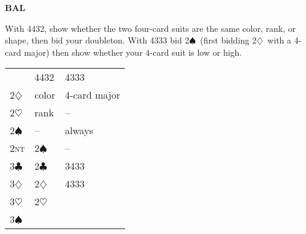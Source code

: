 \documentclass{article}
\renewcommand{\c}{$\clubsuit$}
\renewcommand{\d}{$\diamondsuit$}
\newcommand{\h}{$\heartsuit$}
\newcommand{\s}{$\spadesuit$}
\newcommand{\n}{\textsc{nt}}
\newcommand{\+}{$^+$}
\begin{document}
\begin{table}[htp]
\begin{minipage}{\textwidth}
\bigskip

\textbf{BAL}

With 4432, show whether the two four-card suits are the same color, rank, or shape, then bid your doubleton.  With 4333 bid 2\s\ (first bidding 2\d\ with a 4-card major) then show whether your 4-card suit is low or high.

\smallskip

\begin{tabular}{l|l|l|}
& 4432 & 4333 \\
2\d & color & 4-card major \\
2\h & rank & -- \\
2\s & -- & always \\
2\n & 2\s & -- \\
3\c & 2\c & 3433 \\
3\d & 2\d & 4333 \\
3\h & 2\h & \smash{\vdots} \\
3\s & \smash{\vdots}
\end{tabular}
\end{minipage}
\end{table}
\end{document}
